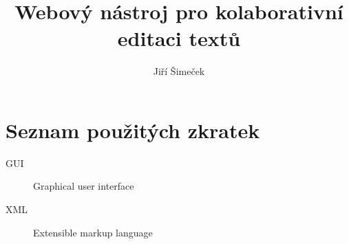 \documentclass[thesis=B,czech]{./template/FITthesis}[2012/06/26]
\title{Webový nástroj pro kolaborativní editaci textů}
\author{Jiří Šimeček} %
\begin{document}

    \begin{introduction}
        
    \end{introduction}

    

    

    

    

    

    \begin{conclusion}
        
    \end{conclusion}

    \printbibliography

    \appendix

    \chapter{Seznam použitých zkratek}
    \begin{description}
        \item[GUI] Graphical user interface
        \item[XML] Extensible markup language
    \end{description}
\end{document}
